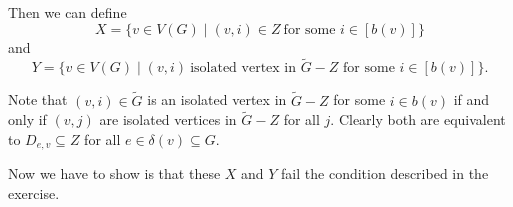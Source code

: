 \begin{exercise}{3}

    Then we can define
    \begin{equation*}
        X = \{ v \in V(G) \mid (v, i) \in Z\ \text{for some $i \in [b(v)]$} \}
    \end{equation*}
    and
    \begin{equation*}
        Y = \{ v \in V(G) \mid (v, i)\ \text{isolated vertex in $\tilde{G} -
        Z$ for some $i \in [b(v)]$} \}.
    \end{equation*}
    
    Note that $(v, i) \in \tilde{G}$ is an isolated vertex in $\tilde{G} - Z$
    for some $i \in b(v)$ if and only if $(v, j)$ are isolated vertices in
    $\tilde{G} - Z$ for all $j$. Clearly both are equivalent to $D_{e, v}
    \subseteq Z$ for all $e \in \delta(v) \subseteq G$.

    Now we have to show is that these $X$ and $Y$ fail the condition described
    in the exercise.


\end{exercise}
